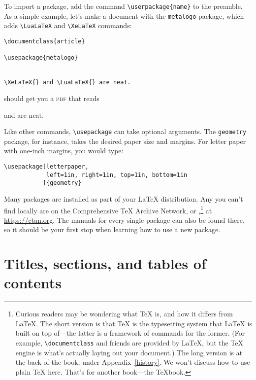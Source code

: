 To import a package, add the command \verb|\userpackage{name}|
to the preamble.
As a simple example, let's make a document with the \texttt{metalogo}
package, which adds \verb|\LuaLaTeX| and \verb|\XeLaTeX| commands:
\begin{leftfigure}
\begin{lstlisting}
\documentclass{article}

\usepackage{metalogo}


\XeLaTeX{} and \LuaLaTeX{} are neat.

\end{lstlisting}
\end{leftfigure}
\begin{samepage}
should get you a \textsc{pdf} that reads
\begin{leftfigure}
\lm \XeLaTeX{} and \LuaLaTeX{} are neat.
\end{leftfigure}
\end{samepage}
Like other commands, \verb|\usepackage| can take optional arguments.
The \texttt{geometry} package, for instance,
takes the desired paper size and margins.
For  letter paper with one-inch margins, you would type:
\begin{leftfigure}
\begin{lstlisting}
\usepackage[letterpaper,
            left=1in, right=1in, top=1in, bottom=1in
           ]{geometry}
\end{lstlisting}
\end{leftfigure}


Many packages are installed as part of your \LaTeX{} distribution.
Any you can't find locally are on the Comprehensive \TeX{}
Archive Network, or ,\punckern\footnote{Curious readers may
be wondering what \TeX{} is, and how it differs from \LaTeX.
The short version is that \TeX{} is the typesetting system that \LaTeX{}
is built on top of---the latter is a framework of commands for the former.
(For example, \texttt{\textbackslash documentclass} and friends are provided by
\LaTeX{}, but the \TeX{} engine is what's actually laying out your document.)
The long version is at the back of the book, under Appendix~\ref{history}.
We won't discuss how to use plain \TeX{} here. That's for another book---the
\TeX book.}
at \url{https://ctan.org}.
The manuals for every single package can also be found there,
so it should be your first stop when learning how to use a new package.

\section{Titles, sections, and tables of contents}

